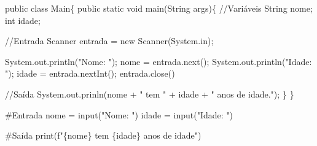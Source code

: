 \documentclass[
  letterpaper,
  DIV=11,
  numbers=noendperiod]{scrreprt}
\newenvironment{Shaded}{\begin{snugshade}}{\end{snugshade}}
\newcommand{\AttributeTok}[1]{\textcolor[rgb]{0.40,0.45,0.13}{#1}}
\newcommand{\BuiltInTok}[1]{\textcolor[rgb]{0.00,0.23,0.31}{#1}}
\newcommand{\CommentTok}[1]{\textcolor[rgb]{0.37,0.37,0.37}{#1}}
\newcommand{\FunctionTok}[1]{\textcolor[rgb]{0.28,0.35,0.67}{#1}}
\newcommand{\KeywordTok}[1]{\textcolor[rgb]{0.00,0.23,0.31}{#1}}
\newcommand{\NormalTok}[1]{\textcolor[rgb]{0.00,0.23,0.31}{#1}}
\newcommand{\OperatorTok}[1]{\textcolor[rgb]{0.37,0.37,0.37}{#1}}
\newcommand{\SpecialCharTok}[1]{\textcolor[rgb]{0.37,0.37,0.37}{#1}}
\newcommand{\SpecialStringTok}[1]{\textcolor[rgb]{0.13,0.47,0.30}{#1}}
\newcommand{\StringTok}[1]{\textcolor[rgb]{0.13,0.47,0.30}{#1}}
\begin{document}
\begin{Shaded}
\begin{Highlighting}[]
  \KeywordTok{public} \KeywordTok{class}\NormalTok{ Main\{}
    \KeywordTok{public} \KeywordTok{static} \KeywordTok{void} \FunctionTok{main}\NormalTok{(}\BuiltInTok{String}\NormalTok{ args)\{}
      \CommentTok{//Variáveis}
      \BuiltInTok{String}\NormalTok{ nome}\OperatorTok{;}
\NormalTok{      int idade}\OperatorTok{;}

      \CommentTok{//Entrada}
\NormalTok{      Scanner entrada }\OperatorTok{=} \KeywordTok{new} \FunctionTok{Scanner}\NormalTok{(System}\OperatorTok{.}\AttributeTok{in}\NormalTok{)}\OperatorTok{;}

\NormalTok{      System}\OperatorTok{.}\AttributeTok{out}\OperatorTok{.}\FunctionTok{println}\NormalTok{(}\StringTok{"Nome: "}\NormalTok{)}\OperatorTok{;}
\NormalTok{      nome }\OperatorTok{=}\NormalTok{ entrada}\OperatorTok{.}\FunctionTok{next}\NormalTok{()}\OperatorTok{;}
\NormalTok{      System}\OperatorTok{.}\AttributeTok{out}\OperatorTok{.}\FunctionTok{println}\NormalTok{(}\StringTok{"Idade: "}\NormalTok{)}\OperatorTok{;}
\NormalTok{      idade }\OperatorTok{=}\NormalTok{ entrada}\OperatorTok{.}\FunctionTok{nextInt}\NormalTok{()}\OperatorTok{;}
\NormalTok{      entrada}\OperatorTok{.}\FunctionTok{close}\NormalTok{()}

      \CommentTok{//Saída}
\NormalTok{      System}\OperatorTok{.}\AttributeTok{out}\OperatorTok{.}\FunctionTok{prinln}\NormalTok{(nome }\OperatorTok{+} \StringTok{" tem "} \OperatorTok{+}\NormalTok{ idade }\OperatorTok{+} \StringTok{" anos de idade."}\NormalTok{)}\OperatorTok{;}
\NormalTok{    \}}
\NormalTok{  \}}
\end{Highlighting}
\end{Shaded}

\begin{Shaded}
\begin{Highlighting}[]
  \CommentTok{\#Entrada}
\NormalTok{  nome }\OperatorTok{=} \BuiltInTok{input}\NormalTok{(}\StringTok{"Nome: "}\NormalTok{)}
\NormalTok{  idade }\OperatorTok{=} \BuiltInTok{input}\NormalTok{(}\StringTok{"Idade: "}\NormalTok{)}

  \CommentTok{\#Saída}
  \BuiltInTok{print}\NormalTok{(}\SpecialStringTok{f"}\SpecialCharTok{\{}\NormalTok{nome}\SpecialCharTok{\}}\SpecialStringTok{ tem }\SpecialCharTok{\{}\NormalTok{idade}\SpecialCharTok{\}}\SpecialStringTok{ anos de idade"}\NormalTok{)}
\end{Highlighting}
\end{Shaded}
\end{document}
